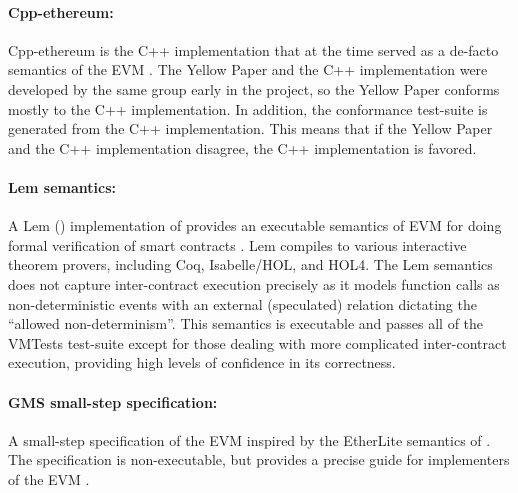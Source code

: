 \paragraph{Cpp-ethereum:}
Cpp-ethereum is the
C++ implementation that at the time served as a de-facto semantics of the EVM
\cite{CppEthereumUrl}.
The Yellow Paper and the C++ implementation were
developed by the same group early in the project,
          so the Yellow Paper conforms mostly to the C++ implementation.
In addition, the conformance test-suite is generated from the C++ implementation.
This means that if the Yellow Paper and the C++ implementation disagree,
     the C++ implementation is favored.

\paragraph{Lem semantics:}
A Lem (\cite{MulliganSIGPLAN14}) implementation of \EVM{} provides
an executable semantics of EVM for doing formal verification of smart contracts \cite{HiraiWSTC17}.
Lem compiles to various interactive theorem provers,
    including Coq, Isabelle/HOL, and HOL4.
The Lem semantics does not capture inter-contract
execution precisely as it models function calls as non-deterministic events with an external (speculated) relation dictating the ``allowed non-determinism''.
This semantics is executable and passes all of the VMTests
test-suite except for those dealing with more complicated inter-contract execution,
  providing high levels of confidence in its correctness.

\paragraph{GMS small-step specification:}
A small-step specification of the EVM inspired by the
EtherLite semantics of \cite{LuuReport16}.
The specification is non-executable, but provides a precise guide for
implementers of the EVM \cite{GrishchenkoTR18}.

